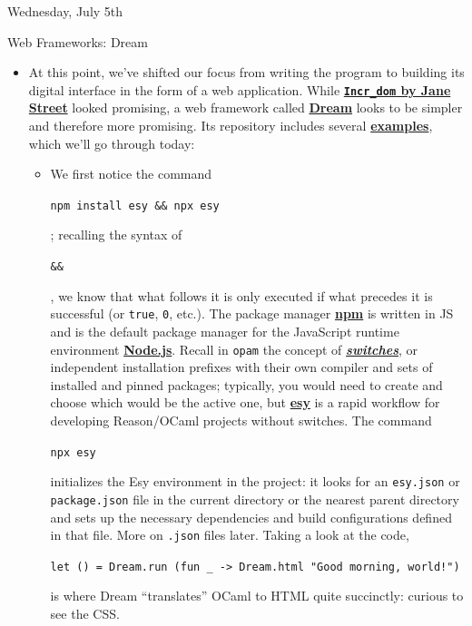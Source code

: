 \documentclass[11pt]{article}
\newcommand\codebox[1]{
    \noindent\hspace{-0.25em}\begin{tcolorbox}[on line, hbox, colback = codeblack, colframe = codeborder, coltext = white, boxrule = 1.5pt, left = 2pt, right = 2pt, top = 0.5pt, bottom = 0.5pt]
    \small\texttt{#1}\normalsize
    \end{tcolorbox}\hspace{-0.25em}
}
\begin{document}
\begin{center}
    \vspace{-0.25em}
    \hspace{0.2cm}
    \vspace{-0.4em}
\end{center}

\begin{hulkgreenbox}{Wednesday, July 5th\vspace{-2.2em}\begin{flushright}Web Frameworks: Dream \end{flushright}}
    \begin{itemize}
        \item At this point, we've shifted our focus from writing the program to building its digital interface in the form of a web application. While \href{https://opensource.janestreet.com/incr_dom/}{\textbf{\texttt{Incr\_dom} by Jane Street}} looked promising, a web framework called \href{https://aantron.github.io/dream/}{\textbf{Dream}} looks to be simpler and therefore more promising. Its repository includes several \href{https://github.com/aantron/dream/tree/master/example}{\textbf{examples}}, which we'll go through today:
        \begin{itemize}
            \item\href{https://github.com/aantron/dream/tree/master/example/1-hello}{} We first notice the command \codebox{npm install esy \&\& npx esy}; recalling the syntax of \codebox{\&\&}, we know that what follows it is only executed if what precedes it is successful (or \texttt{true}, \texttt{0}, etc.). The package manager \href{https://www.npmjs.com/}{\textbf{npm}} is written in JS and is the default package manager for the JavaScript runtime environment \href{https://nodejs.org/en}{\textbf{Node.js}}. Recall in \texttt{opam} the concept of \href{https://opam.ocaml.org/doc/man/opam-switch.html}{\textbf{\textit{switches}}}, or independent installation prefixes with their own compiler and sets of installed and pinned packages; typically, you would need to create and choose which would be the active one, but \href{https://esy.sh/docs/en/what-why.html}{\textbf{esy}} is a rapid workflow for developing Reason/OCaml projects without switches. The command \codebox{npx esy} initializes the Esy environment in the project: it looks for an \texttt{esy.json} or \texttt{package.json} file in the current directory or the nearest parent directory and sets up the necessary dependencies and build configurations defined in that file. More on \texttt{.json} files later. Taking a look at the code, \codebox{let () = Dream.run (fun \_ -> Dream.html "Good morning, world!")} is where Dream ``translates'' OCaml to HTML quite succinctly: curious to see the CSS.


\end{itemize}
\end{itemize}
\end{hulkgreenbox}
\end{document}
